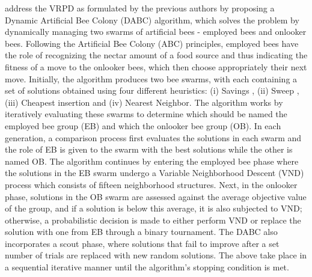 \documentclass{article}
\begin{document}
	\citeauthor{Lei2022} \cite{Lei2022} address the VRPD as formulated by the previous authors by proposing a Dynamic Artificial Bee Colony (DABC) algorithm, which solves the problem by dynamically managing two swarms of artificial bees - employed bees and onlooker bees. Following the Artificial Bee Colony (ABC) principles, employed bees have the role of recognizing the nectar amount of a food source and thus indicating the fitness of a move to the onlooker bees, which then choose appropriately their next move.
	Initially, the algorithm produces two bee swarms, with each containing a set of solutions obtained using four different heuristics: (i) Savings \cite{CW1964}, (ii) Sweep \cite{Sweep1974}, (iii) Cheapest insertion \cite{CheapestInsertion1976} and (iv) Nearest Neighbor. The algorithm works by iteratively evaluating these swarms to determine which should be named the employed bee group (EB) and which the onlooker bee group (OB). In each generation, a comparison process first evaluates the solutions in each swarm and the role of EB is given to the swarm with the best solutions while the other is named OB.
	The algorithm continues by entering the employed bee phase where the solutions in the EB swarm undergo a Variable Neighborhood Descent (VND) process which consists of fifteen neighborhood structures. Next, in the onlooker phase, solutions in the OB swarm are assessed against the average objective value of the group, and if a solution is below this average, it is also subjected to VND; otherwise, a probabilistic decision is made to either perform VND or replace the solution with one from EB through a binary tournament. The DABC also incorporates a scout phase, where solutions that fail to improve after a set number of trials are replaced with new random solutions. The above take place in a sequential iterative manner until the algorithm's stopping condition is met.
\end{document}

